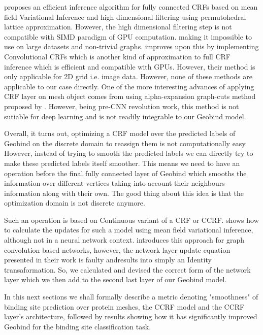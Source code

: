 \citet{krahenbuhl2012efficient} proposes an efficient inference algorithm for fully connected CRFs
based on mean field Variational Inference and high dimensional filtering using permutohedral lattice
approximation. However, the high dimensional filtering step is not compatible with
SIMD\citep{nickolls2008scalable} paradigm of GPU computation. \citep{teichmann2018convolutional}
making it impossible to use on large datasets and non-trivial graphs.
\citet{teichmann2018convolutional} improves upon this by implementing Convolutional CRFs which is
another kind of approximation to full CRF inference which is efficient and compatible with GPUs.
However, their method is only applicable for 2D grid i.e. image data.  However, none of these methods
are applicable to our case directly. One of the more interesting advances of applying CRF layer on
mesh object comes from \citet{kalogerakis2010learning} using alpha-expansion graph-cuts method proposed by
\citet{boykov2001fast}. However, being pre-CNN revolution work, this method is not sutiable for deep
learning and is not readily integrable to our Geobind model. 

Overall, it turns out, optimizing a CRF model over the predicted labels of Geobind on the discrete
domain to reassign them is not computationally easy. However, instead of trying to smooth the
predicted labels we can directly try to make these predicted labels itself smoother. This means we
need to have an operation before the final fully connected layer of Geobind which smooths the
information over different vertices taking into account their neighbours information along with
their own. The good thing about this idea is that the optimization domain is not discrete anymore.

Such an operation is based on Continuous variant of a CRF or CCRF. \citet{ristovski2013continuous}
shows how to calculate the updates for such a model using mean field variational inference, although
not in a neural network context. \citet{gao2019conditional} introduces this approach for graph
convolution based networks, however, the network layer update equation presented in their work is
faulty andresults into simply an Identity transaformation. So, we calculated and devised the correct
form of the network layer which we then add to the second last layer of our Geobind model.

In this next sections we shall formally describe a metric  denoting "smoothness" of binding site
prediction over protein meshes, the CCRF model and the CCRF layer's architecture, followed
by results showing how it has significantly improved Geobind for the binding site classification task.

